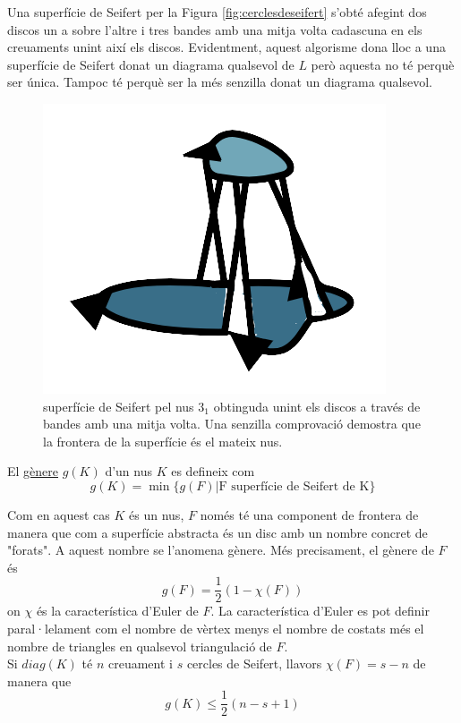Una superfície de Seifert per la Figura \ref{fig:cerclesdeseifert} s'obté afegint dos discos un a sobre l'altre i tres bandes amb una mitja volta cadascuna en els creuaments unint així els discos. Evidentment, aquest algorisme dona lloc a una superfície de Seifert donat un diagrama qualsevol de $L$ però aquesta no té perquè ser única. Tampoc té perquè ser la més senzilla donat un diagrama qualsevol.

\begin{figure}
	\centering
	\includegraphics[width=0.6\linewidth]{img/superficiedeseifert.png}
	\caption{superfície de Seifert pel nus $3_1$ obtinguda unint els discos a través de bandes amb una mitja volta. Una senzilla comprovació demostra que la frontera de la superfície és el mateix nus.}\label{fig:superficiedeseifert2}
\end{figure}

\begin{definition}\label{def:genere}
	El \underline{gènere} $g(K)$ d'un nus $K$ es defineix com $$g(K)=\min\{g(F)| \text{F superfície de Seifert de K}\}$$
\end{definition}

Com en aquest cas $K$ és un nus, $F$ només té una component de frontera de manera que com a superfície abstracta és un disc amb un nombre concret de "forats". A aquest nombre se l'anomena gènere. Més precisament, el gènere de $F$ és $$g(F)=\frac{1}{2}(1-\mathcal{\chi}(F))$$ on $\mathcal{\chi}$ és la característica d'Euler de $F$. La característica d'Euler es pot definir paral·lelament com el nombre de vèrtex menys el nombre de costats més el nombre de triangles en qualsevol triangulació de $F$.\\

Si $diag(K)$ té $n$ creuament i $s$ cercles de Seifert, llavors $\mathcal{\chi}(F)=s-n$ de manera que $$g(K)\leq \frac{1}{2}(n-s+1)$$

